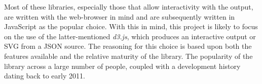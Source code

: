     
    \begin{remarks}
        Most of these libraries, especially those that allow interactivity with the output, are written with the web-browser in mind and are subsequently written in JavaScript as the popular choice.
        With this in mind, this project is likely to focus on the use of the latter-mentioned \textit{d3.js}, which produces an interactive output or SVG from a JSON source.
        The reasoning for this choice is based upon both the features available and the relative maturity of the library.
        The popularity of the library across a large number of people, coupled with a development history dating back to early 2011.
    \end{remarks}
